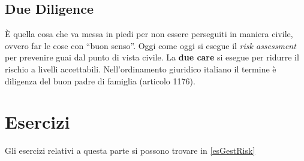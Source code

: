 \subsection{Due Diligence}

È quella cosa che va messa in piedi per non essere perseguiti in maniera civile,
ovvero far le cose con ``buon senso''. Oggi come oggi si esegue il \textit{risk
assessment} per prevenire guai dal punto di vista civile. La \textbf{due care}
si esegue per ridurre il rischio a livelli accettabili. Nell'ordinamento
giuridico italiano il termine è diligenza del buon padre di famiglia (articolo
1176).


\section{Esercizi}

Gli esercizi relativi a questa parte si possono trovare in \ref{esGestRisk}
